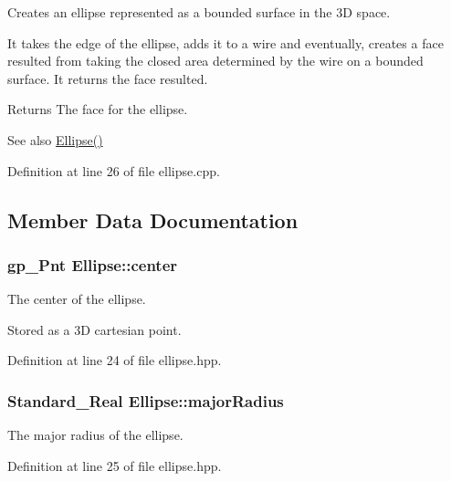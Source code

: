 Creates an ellipse represented as a bounded surface in the 3D space. 

It takes the edge of the ellipse, adds it to a wire and eventually, creates a face resulted from taking the closed area determined by the wire on a bounded surface. It returns the face resulted. \begin{DoxyReturn}{Returns}
The face for the ellipse. 
\end{DoxyReturn}
\begin{DoxySeeAlso}{See also}
\hyperlink{class_ellipse_a064dd5b942b77385f8e22004226887b7}{Ellipse()} 
\end{DoxySeeAlso}


Definition at line 26 of file ellipse.cpp.



\subsection{Member Data Documentation}
\hypertarget{class_ellipse_a3e5ba76a35bf58415c1d809dd58a0d3c}{
\subsubsection[{center}]{\setlength{\rightskip}{0pt plus 5cm}gp\_\-Pnt {\bf Ellipse::center}}}
\label{class_ellipse_a3e5ba76a35bf58415c1d809dd58a0d3c}


The center of the ellipse. 

Stored as a 3D cartesian point. 

Definition at line 24 of file ellipse.hpp.

\hypertarget{class_ellipse_a0a4ec2204aecf14518c92a8ec2c9e190}{
\subsubsection[{majorRadius}]{\setlength{\rightskip}{0pt plus 5cm}Standard\_\-Real {\bf Ellipse::majorRadius}}}
\label{class_ellipse_a0a4ec2204aecf14518c92a8ec2c9e190}


The major radius of the ellipse. 



Definition at line 25 of file ellipse.hpp.

